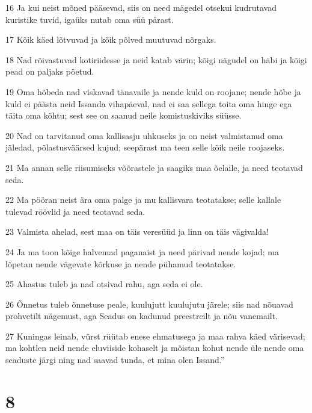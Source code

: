\par 16 Ja kui neist mõned pääsevad, siis on need mägedel otsekui kudrutavad kuristike tuvid, igaüks nutab oma süü pärast.
\par 17 Kõik käed lõtvuvad ja kõik põlved muutuvad nõrgaks.
\par 18 Nad rõivastuvad kotiriidesse ja neid katab värin; kõigi nägudel on häbi ja kõigi pead on paljaks pöetud.
\par 19 Oma hõbeda nad viskavad tänavaile ja nende kuld on roojane; nende hõbe ja kuld ei päästa neid Issanda vihapäeval, nad ei saa sellega toita oma hinge ega täita oma kõhtu; sest see on saanud neile komistuskiviks süüsse.
\par 20 Nad on tarvitanud oma kallisasju uhkuseks ja on neist valmistanud oma jäledad, põlastusväärsed kujud; seepärast ma teen selle kõik neile roojaseks.
\par 21 Ma annan selle riisumiseks võõrastele ja saagiks maa õelaile, ja need teotavad seda.
\par 22 Ma pööran neist ära oma palge ja mu kallisvara teotatakse; selle kallale tulevad röövlid ja need teotavad seda.
\par 23 Valmista ahelad, sest maa on täis veresüüd ja linn on täis vägivalda!
\par 24 Ja ma toon kõige halvemad paganaist ja need pärivad nende kojad; ma lõpetan nende vägevate kõrkuse ja nende pühamud teotatakse.
\par 25 Ahastus tuleb ja nad otsivad rahu, aga seda ei ole.
\par 26 Õnnetus tuleb õnnetuse peale, kuulujutt kuulujutu järele; siis nad nõuavad prohvetilt nägemust, aga Seadus on kadunud preestreilt ja nõu vanemailt.
\par 27 Kuningas leinab, vürst rüütab enese ehmatusega ja maa rahva käed värisevad; ma kohtlen neid nende eluviiside kohaselt ja mõistan kohut nende üle nende oma seaduste järgi ning nad saavad tunda, et mina olen Issand.”

\chapter{8}

